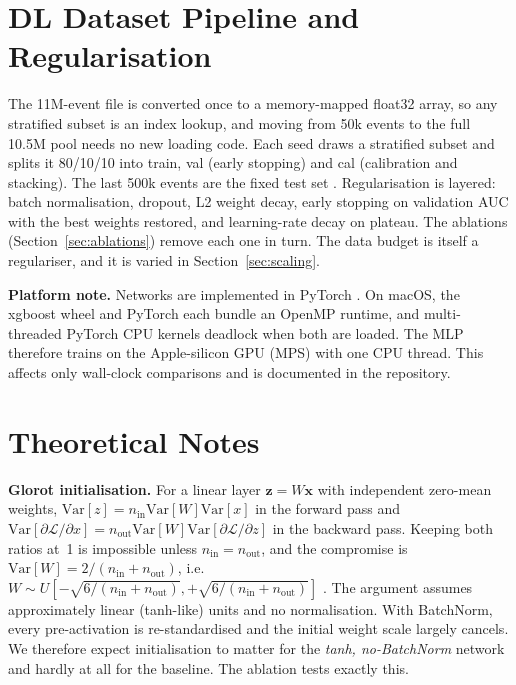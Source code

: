 \documentclass[conference]{IEEEtran}
\begin{document}
\section{DL Dataset Pipeline and Regularisation}\label{sec:data}
The 11M-event file is converted once to a memory-mapped float32 array, so any stratified subset is
an index lookup, and moving from 50k events to the full 10.5M pool needs no new loading code. Each
seed draws a stratified subset and splits it 80/10/10 into train, val (early stopping) and cal
(calibration and stacking). The last 500k events are the fixed test set \cite{baldi2014searching}.
Regularisation is layered: batch normalisation, dropout, L2 weight decay, early stopping on validation
AUC with the best weights restored, and learning-rate decay on plateau. The ablations
(Section~\ref{sec:ablations}) remove each one in turn. The data budget is itself a regulariser, and
it is varied in Section~\ref{sec:scaling}.

\textbf{Platform note.} Networks are implemented in PyTorch \cite{paszke2019pytorch}. On macOS, the
xgboost wheel and PyTorch each bundle an OpenMP runtime, and
multi-threaded PyTorch CPU kernels deadlock when both are loaded. The MLP therefore trains on the
Apple-silicon GPU (MPS) with one CPU thread. This affects only wall-clock comparisons and is
documented in the repository.

\section{Theoretical Notes}\label{sec:theory}
\textbf{Glorot initialisation.} For a linear layer $\mathbf z=W\mathbf x$ with independent zero-mean
weights, $\mathrm{Var}[z]=n_\mathrm{in}\mathrm{Var}[W]\mathrm{Var}[x]$ in the forward pass and
$\mathrm{Var}[\partial\mathcal L/\partial x]=n_\mathrm{out}\mathrm{Var}[W]\mathrm{Var}[\partial\mathcal L/\partial z]$
in the backward pass. Keeping both ratios at~1 is impossible unless $n_\mathrm{in}=n_\mathrm{out}$, and
the compromise is $\mathrm{Var}[W]=2/(n_\mathrm{in}+n_\mathrm{out})$, i.e.\
$W\sim U[-\sqrt{6/(n_\mathrm{in}+n_\mathrm{out})},+\sqrt{6/(n_\mathrm{in}+n_\mathrm{out})}]$
\cite{glorot2010understanding}. The argument assumes approximately linear (tanh-like) units and no
normalisation. With BatchNorm, every pre-activation is re-standardised and the initial weight scale
largely cancels. We therefore expect initialisation to matter for the \emph{tanh, no-BatchNorm}
network and hardly at all for the baseline. The ablation tests exactly this.
\end{document}
